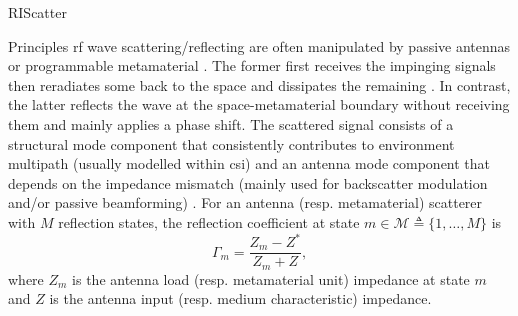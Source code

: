 \documentclass[journal]{IEEEtran}
\begin{document}
\begin{section}{RIScatter}
	\begin{subsection}{Principles}
		\gls{rf} wave scattering/reflecting are often manipulated by passive antennas or programmable metamaterial \cite{Liang2022}.
		The former first receives the impinging signals then reradiates some back to the space and dissipates the remaining \cite{Dobkin2012}.
		In contrast, the latter reflects the wave at the space-metamaterial boundary without receiving them and mainly applies a phase shift.
		The scattered signal consists of a structural mode component that consistently contributes to environment multipath (usually modelled within \gls{csi}) and an antenna mode component that depends on the impedance mismatch (mainly used for backscatter modulation and/or passive beamforming) \cite{Hansen1989}.
		For an antenna (resp. metamaterial) scatterer with $M$ reflection states, the reflection coefficient at state $m \in \mathcal{M} \triangleq \{1,\ldots,M\}$ is
		\begin{equation}
			\Gamma_m = \frac{Z_m - Z^*}{Z_m + Z},
			\label{eq:reflection_coefficient}
		\end{equation}
		where $Z_m$ is the antenna load (resp. metamaterial unit) impedance at state $m$ and $Z$ is the antenna input (resp. medium characteristic) impedance.


\end{subsection}
\end{section}
\end{document}
